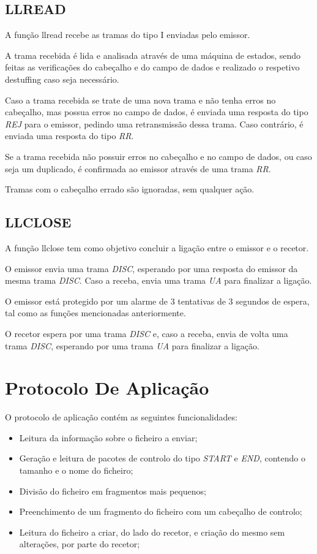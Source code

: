 \documentclass{article}
\begin{document}
\subsection{LLREAD}

A função llread recebe as tramas do tipo I enviadas pelo emissor.

A trama recebida é lida e analisada através de uma máquina de estados, sendo feitas as verificações do cabeçalho e do campo de dados e realizado o respetivo destuffing caso seja necessário.

Caso a trama recebida se trate de uma nova trama e não tenha erros no cabeçalho, mas possua erros no campo de dados, é enviada uma resposta do tipo \textit{REJ} para o emissor, pedindo uma retransmissão dessa trama. Caso contrário, é enviada uma resposta do tipo \textit{RR}.

Se a trama recebida não possuir erros no cabeçalho e no campo de dados, ou caso seja um duplicado, é confirmada ao emissor através de uma trama \textit{RR}.

Tramas com o cabeçalho errado são ignoradas, sem qualquer ação.

\subsection{LLCLOSE}

A função llclose tem como objetivo concluir a ligação entre o emissor e o recetor.

O emissor envia uma trama \textit{DISC}, esperando por uma resposta do emissor da mesma trama \textit{DISC}. Caso a receba, envia uma trama \textit{UA} para finalizar a ligação.

O emissor está protegido por um alarme de 3 tentativas de 3 segundos de espera, tal como as funções mencionadas anteriormente.

O recetor espera por uma trama \textit{DISC} e, caso a receba, envia de volta uma trama \textit{DISC}, esperando por uma trama \textit{UA} para finalizar a ligação.


\section{Protocolo De Aplicação}

O protocolo de aplicação contém as seguintes funcionalidades:

\begin{itemize}
	\item Leitura da informação sobre o ficheiro a enviar;
	\item Geração e leitura de pacotes de controlo do tipo \textit{START} e \textit{END}, contendo o tamanho e o nome do ficheiro;
	\item Divisão do ficheiro em fragmentos mais pequenos;
	\item Preenchimento de um fragmento do ficheiro com um cabeçalho de controlo;
	\item Leitura do ficheiro a criar, do lado do recetor, e criação do mesmo sem alterações, por parte do recetor;

\end{itemize}
\end{document}
